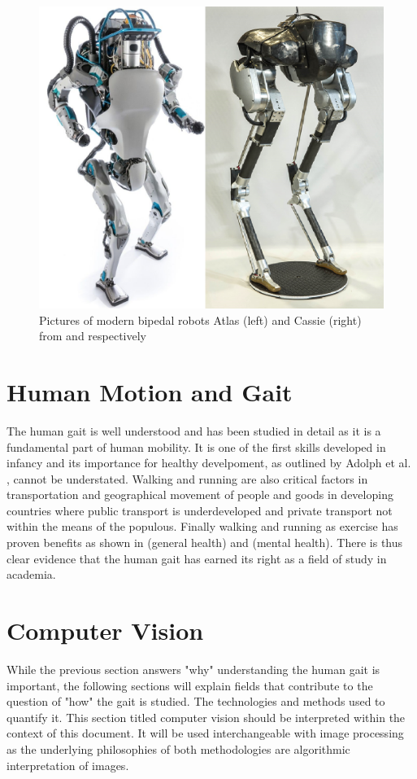 \begin{figure}[!ht] 
\captionsetup{width=0.8\linewidth, font=small}  
\includegraphics[width=0.8\linewidth]{figures/bipeds.png}
\caption{Pictures of modern bipedal robots Atlas (left) and Cassie (right) from \cite{bdpic} and \cite{arpic} respectively}
\label{fig:bipeds}
\end{figure}

\section{Human Motion and Gait}
The human gait is well understood and has been studied in detail as it is a fundamental part of human mobility. It is one of the first skills developed in infancy and its importance for healthy develpoment, as outlined by Adolph et al. \cite{adolph2013road}, cannot be understated. Walking and running are also critical factors in transportation and geographical movement of people and goods in developing countries where public transport is underdeveloped and private transport not within the means of the populous. Finally walking and running as exercise has proven benefits as shown in \cite{hanson2015there} (general health) and \cite{fox1999influence} (mental health). There is thus clear evidence that the human gait has earned its right as a field of study in academia.

\section{Computer Vision}
While the previous section answers "why" understanding the human gait is important, the following sections will explain fields that contribute to the question of "how" the gait is studied. The technologies and methods used to quantify it. This section titled computer vision should be interpreted within the context of this document. It will be used interchangeable with image processing as the underlying philosophies of both methodologies are algorithmic interpretation of images.

